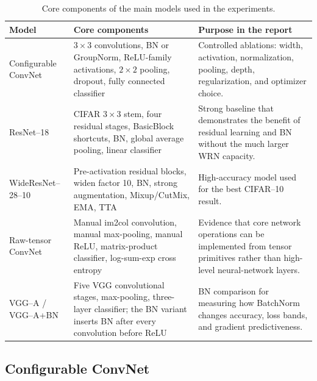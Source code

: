 \documentclass[11pt]{article}
\begin{document}
\begin{table}[htbp]
\centering
\small
\caption{Core components of the main models used in the experiments.}
\label{tab:modelcomponents}
\begin{tabularx}{\textwidth}{l>{\raggedright\arraybackslash}p{}X}
\toprule
Model & Core components & Purpose in the report \\
\midrule
Configurable ConvNet &
$3\times3$ convolutions, BN or GroupNorm, ReLU-family activations,
$2\times2$ pooling, dropout, fully connected classifier &
Controlled ablations: width, activation, normalization, pooling, depth,
regularization, and optimizer choice. \\
ResNet--18 &
CIFAR $3\times3$ stem, four residual stages, BasicBlock shortcuts, BN,
global average pooling, linear classifier &
Strong baseline that demonstrates the benefit of residual learning and BN
without the much larger WRN capacity. \\
WideResNet--28--10 &
Pre-activation residual blocks, widen factor 10, BN, strong augmentation,
Mixup/CutMix, EMA, TTA &
High-accuracy model used for the best CIFAR--10 result. \\
Raw-tensor ConvNet &
Manual im2col convolution, manual max-pooling, manual ReLU, matrix-product
classifier, log-sum-exp cross entropy &
Evidence that core network operations can be implemented from tensor
primitives rather than high-level neural-network layers. \\
VGG--A / VGG--A+BN &
Five VGG convolutional stages, max-pooling, three-layer classifier; the BN
variant inserts BN after every convolution before ReLU &
BN comparison for measuring how BatchNorm changes accuracy, loss bands,
and gradient predictiveness. \\
\bottomrule
\end{tabularx}
\end{table}

\subsection{Configurable ConvNet}
\label{sec:arch}
\end{document}
